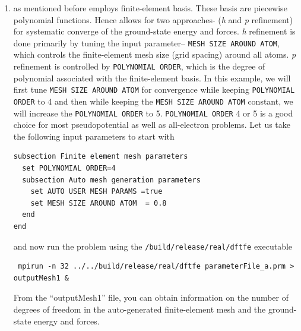 \begin{enumerate}
\item \dftfe{} as mentioned before employs finite-element basis. These basis are piecewise polynomial functions. Hence \dftfe{} allows for two approaches- (\emph{h} and \emph{p} refinement) for systematic converge of the ground-state energy and forces. \emph{h} refinement is done primarily by tuning the input parameter-- \verb|MESH SIZE AROUND ATOM|, which controls the finite-element mesh size (grid spacing) around all atoms. \emph{p} refinement is controlled by \verb|POLYNOMIAL ORDER|, which is the degree of polynomial associated with the finite-element basis. In this example, we will first tune \verb|MESH SIZE AROUND ATOM| for convergence while keeping \verb|POLYNOMIAL ORDER| to 4 and then while keeping the \verb|MESH SIZE AROUND ATOM| constant, we will increase the \verb|POLYNOMIAL ORDER| to 5. \verb|POLYNOMIAL ORDER| 4 or 5 is a good choice for most pseudopotential as well as all-electron problems. Let us take the following input parameters to start with  
\begin{verbatim}	
subsection Finite element mesh parameters
  set POLYNOMIAL ORDER=4
  subsection Auto mesh generation parameters
    set AUTO USER MESH PARAMS =true
    set MESH SIZE AROUND ATOM  = 0.8
  end
end
\end{verbatim} 
and now run the problem using the \verb|/build/release/real/dftfe| executable 
\begin{verbatim}
 mpirun -n 32 ../../build/release/real/dftfe parameterFile_a.prm > outputMesh1 &
\end{verbatim}
From the ``outputMesh1'' file, you can obtain information on the number of degrees of freedom in the auto-generated finite-element mesh and the ground-state energy and forces. 


\end{enumerate}
